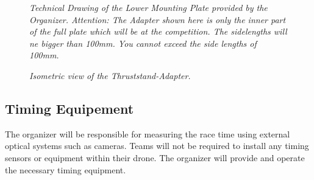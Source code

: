 \documentclass{article}
\begin{document}
\begin{figure}
  \centering
\caption{\textit{Technical Drawing of the Lower Mounting Plate provided by the Organizer. Attention: The Adapter shown here is only the inner part of the full plate which will be at the competition. The sidelengths will ne bigger than 100mm. You cannot exceed the side lengths of 100mm.}}
\end{figure}

\begin{figure}[h!]
 \centering
\caption{\textit{Isometric view of the Thruststand-Adapter.}}
\end{figure}



\subsection{Timing Equipement}
The organizer will be responsible for measuring the race time using external optical systems such as cameras. Teams will not be required to install any timing sensors or equipment within their drone. The organizer will provide and operate the necessary timing equipment.
\end{document}
